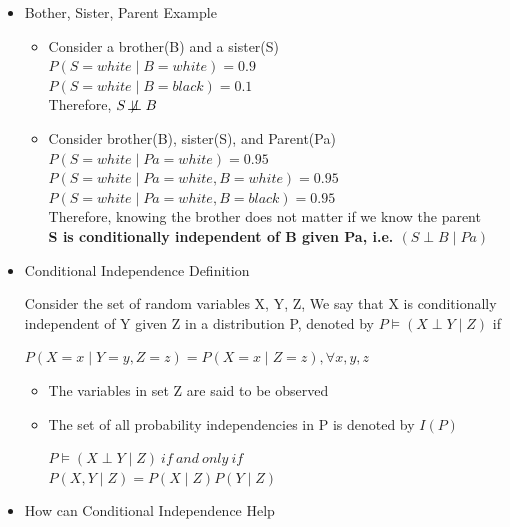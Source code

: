 \documentclass[11pt,a4paper]{report}
\begin{document}
\begin{itemize}
    \item Bother, Sister, Parent Example

\begin{itemize}
    \item Consider a brother(B) and a sister(S)\\
    $P(S = white \mid B = white) = 0.9$\\
    $P(S = white \mid B = black) = 0.1$\\
    Therefore, $S \not\!\perp\!\!\!\perp B$ 
    \item Consider brother(B), sister(S), and Parent(Pa)\\
    $P(S = white \mid Pa = white) = 0.95$\\
    $P(S = white \mid Pa = white, B = white) = 0.95$\\
    $P(S = white \mid Pa = white, B = black) = 0.95$\\
    \vspace{0.5cm}
    Therefore, knowing the brother does not matter if we know the parent\\
    \textbf{S is conditionally independent of B given Pa, i.e. $(S \perp B \mid Pa)$}
\end{itemize}

\item Conditional Independence Definition

Consider the set of random variables X, Y, Z,
We say that X is conditionally independent of Y given Z in a distribution P, denoted by $P \models (X \perp Y \mid Z)$ if
\begin{center}
    $P(X = x \mid Y = y, Z = z) = P(X = x \mid Z = z), \forall x,y,z$
\end{center}

\begin{itemize}
    \item The variables in set Z are said to be observed
    \item The set of all probability independencies in P is denoted by $I(P)$
    \begin{center}
        $P \models (X \perp Y \mid Z)\ if\ and\ only\ if$\\
        $P(X, Y \mid Z) = P(X \mid Z)P(Y \mid Z)$
    \end{center}
\end{itemize}
\item How can Conditional Independence Help


\end{itemize}
\end{document}
